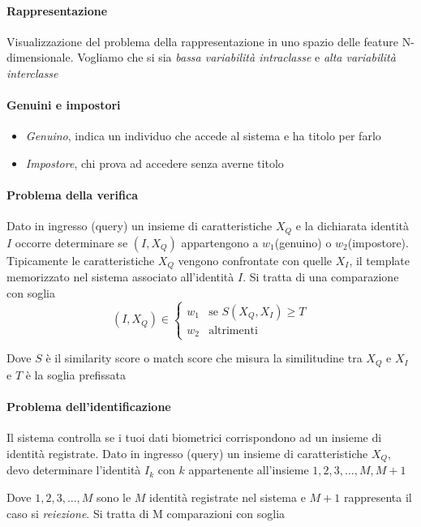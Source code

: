 \paragraph{Rappresentazione}
Visualizzazione del problema della rappresentazione in uno spazio delle feature N-dimensionale. Vogliamo che si sia \textit{bassa variabilità intraclasse} e \textit{alta variabilità interclasse}

\paragraph{Genuini e impostori}
\begin{itemize}
    \item \textit{Genuino}, indica un individuo che accede al sistema e ha titolo per farlo
    \item \textit{Impostore}, chi prova ad accedere senza averne titolo
\end{itemize}

\paragraph{Problema della verifica}
Dato in ingresso (query) un insieme di caratteristiche $X_Q$ e la dichiarata identità $I$ occorre determinare se $(I,X_Q)$ appartengono a $w_1$(genuino) o $w_2$(impostore). Tipicamente le caratteristiche $X_Q$ vengono confrontate con quelle $X_I$, il template memorizzato nel sistema associato all'identità $I$. Si tratta di una comparazione con soglia
\[
(I,X_Q) \in
\begin{cases}
  w_1 & \text{se } S(X_Q,X_I) \geq T \\
  w_2 & \text{altrimenti }
\end{cases}
\]

Dove $S$ è il similarity score o match score che misura la similitudine tra $X_Q$ e $X_I$ e $T$ è la soglia prefissata

\paragraph{Problema dell'identificazione}
Il sistema controlla se i tuoi dati biometrici corrispondono ad un insieme di
identità registrate. Dato in ingresso (query) un insieme di caratteristiche $X_Q$, devo determinare l'identità $I_k$ con $k$ appartenente all'insieme ${1,2,3,\dots,M,M+1}$

Dove ${1,2,3,\dots,M}$ sono le $M$ identità registrate nel sistema e $M+1$ rappresenta il caso si \textit{reiezione}. Si tratta di M comparazioni con soglia

